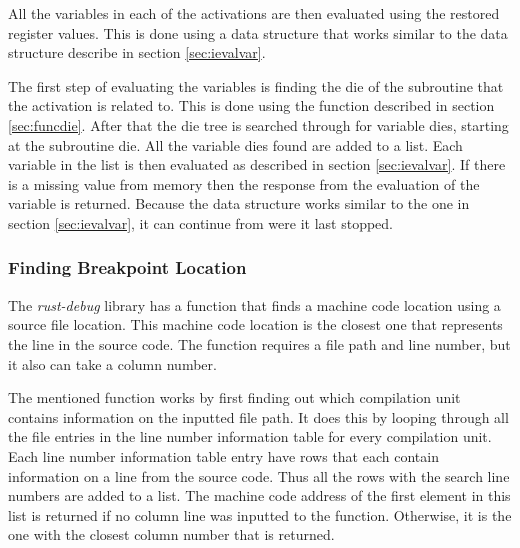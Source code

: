 All the variables in each of the activations are then evaluated using the restored register values.
This is done using a data structure that works similar to the data structure describe in section \ref{sec:ievalvar}.

The first step of evaluating the variables is finding the \gls{die} of the subroutine that the activation is related to.
This is done using the function described in section \ref{sec:funcdie}.
After that the \gls{die} tree is searched through for variable \glspl{die}, starting at the subroutine \gls{die}.
All the variable \glspl{die} found are added to a list.
Each variable in the list is then evaluated as described in section \ref{sec:ievalvar}.
If there is a missing value from memory then the response from the evaluation of the variable is returned.
Because the data structure works similar to the one in section \ref{sec:ievalvar}, it can continue from were it last stopped.


\subsubsection{Finding Breakpoint Location}
The \emph{rust-debug} library has a function that finds a machine code location using a source file location.
This machine code location is the closest one that represents the line in the source code.
The function requires a file path and line number, but it also can take a column number.


The mentioned function works by first finding out which compilation unit contains information on the inputted file path.
It does this by looping through all the file entries in the line number information table for every compilation unit.
Each line number information table entry have rows that each contain information on a line from the source code.
Thus all the rows with the search line numbers are added to a list.
The machine code address of the first element in this list is returned if no column line was inputted to the function.
Otherwise, it is the one with the closest column number that is returned.

